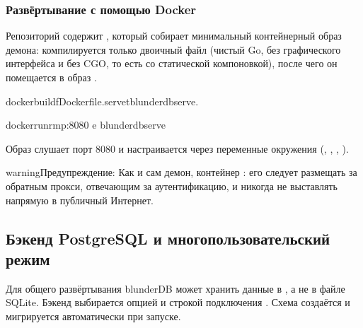 \documentclass[letterpaper,10pt,russian]{sphinxmanual}
\begin{document}
\subsubsection{Развёртывание с помощью Docker}
\label{\detokenize{mode_headless:deploiement-avec-docker}}\label{\detokenize{mode_headless:headless-docker}}
\sphinxAtStartPar
Репозиторий содержит , который собирает минимальный контейнерный образ демона: компилируется только двоичный файл  (чистый Go, без графического интерфейса и без CGO, то есть со статической компоновкой), после чего он помещается в образ .

\begin{sphinxVerbatim}[commandchars=\\\{\}]
dockerbuild\PYGZhy{}fDockerfile.serve\PYGZhy{}tblunderdb\PYGZhy{}serve.

dockerrun\PYGZhy{}\PYGZhy{}rm\PYGZhy{}p:8080
\PYGZhy{}e
blunderdb\PYGZhy{}serve
\end{sphinxVerbatim}

\sphinxAtStartPar
Образ слушает порт 8080 и настраивается через переменные окружения (, , , ).

\begin{sphinxadmonition}{warning}{Предупреждение:}
\sphinxAtStartPar
Как и сам демон, контейнер : его следует размещать за обратным прокси, отвечающим за аутентификацию, и никогда не выставлять напрямую в публичный Интернет.
\end{sphinxadmonition}


\subsection{Бэкенд PostgreSQL и многопользовательский режим}
\label{\detokenize{mode_headless:backend-postgresql-et-multi-utilisateurs}}\label{\detokenize{mode_headless:headless-postgres}}
\sphinxAtStartPar
Для общего развёртывания blunderDB может хранить данные в , а не в файле SQLite. Бэкенд выбирается опцией  и строкой подключения . Схема создаётся и мигрируется автоматически при запуске.
\end{document}
